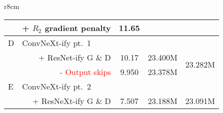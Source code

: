 \begin{wraptable}[21]{r}{8cm}
{\begin{tabular}{ l r c c c }
   & \textcolor[rgb]{0,0.502,0.502}{+ $R_2$ gradient penalty}                                                                                                                                                                                                                                                                                                                                                                                                & \multirow{1}{*}{11.65} &                          &                           \\ 
\midrule
D  & \multicolumn{1}{l}{ConvNeXt-ify pt.~1}                                                                                                                                                                                                                                                                                                                                                                                                                 &                        &                          &                           \\ 
 & \textcolor[rgb]{0,0.502,0.502}{+ ResNet-ify G $\&$ D}                                                                                                                                                                                                                                                                                                                                                                                                   & 10.17                  & 23.400M                  & \multirow{2}{*}{23.282M}  \\
   & \textcolor{red}{- Output skips}                                                                                                                                                                                                                                                                                                                                                                                                                         & 9.950 & 23.378M &                           \\ 
\midrule
E  & \multicolumn{1}{l}{ConvNeXt-ify pt.~2}                              &                        &                          &                           \\
 & \textcolor[rgb]{0,0.502,0.502}{+ ResNeXt-ify G $\&$ D}                                                                                                                                                                                                                                                                                                                                                                                                  & 7.507                  & 23.188M                  & 23.091M                   \\ 

\end{tabular}}
\end{wraptable}
